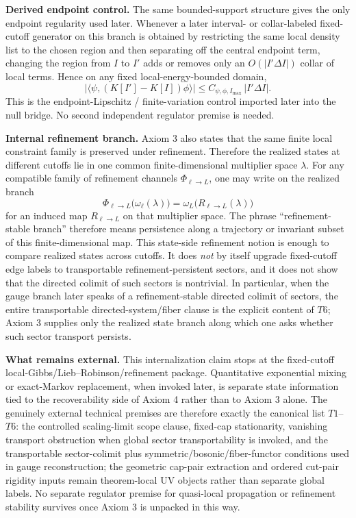 \textbf{Derived endpoint control.} The same bounded-support structure gives the only endpoint regularity used later. Whenever a later interval- or collar-labeled fixed-cutoff generator on this branch is obtained by restricting the same local density list to the chosen region and then separating off the central endpoint term, changing the region from \(I\) to \(I'\) adds or removes only an \(O(|I'\Delta I|)\) collar of local terms. Hence on any fixed local-energy-bounded domain,
\[
\left|\langle\psi,(K[I']-K[I])\phi\rangle\right|
\le
C_{\psi,\phi,I_{\max}}\,|I'\Delta I|.
\]
This is the endpoint-Lipschitz / finite-variation control imported later into the null bridge. No second independent regulator premise is needed.

\textbf{Internal refinement branch.} Axiom 3 also states that the same finite local constraint family is preserved under refinement. Therefore the realized states at different cutoffs lie in one common finite-dimensional multiplier space \(\lambda\). For any compatible family of refinement channels \(\Phi_{\ell\to L}\), one may write on the realized branch
\[
\Phi_{\ell\to L}\bigl(\omega_\ell(\lambda)\bigr)
=
\omega_L\!\bigl(R_{\ell\to L}(\lambda)\bigr)
\]
for an induced map \(R_{\ell\to L}\) on that multiplier space. The phrase ``refinement-stable branch'' therefore means persistence along a trajectory or invariant subset of this finite-dimensional map. This state-side refinement notion is enough to compare realized states across cutoffs. It does \emph{not} by itself upgrade fixed-cutoff edge labels to transportable refinement-persistent sectors, and it does not show that the directed colimit of such sectors is nontrivial. In particular, when the gauge branch later speaks of a refinement-stable directed colimit of sectors, the entire transportable directed-system/fiber clause is the explicit content of \(T6\); Axiom 3 supplies only the realized state branch along which one asks whether such sector transport persists.

\textbf{What remains external.} This internalization claim stops at the fixed-cutoff local-Gibbs/Lieb--Robinson/refinement package. Quantitative exponential mixing or exact-Markov replacement, when invoked later, is separate state information tied to the recoverability side of Axiom 4 rather than to Axiom 3 alone. The genuinely external technical premises are therefore exactly the canonical list \(T1\)--\(T6\): the controlled scaling-limit scope clause, fixed-cap stationarity, vanishing transport obstruction when global sector transportability is invoked, and the transportable sector-colimit plus symmetric/bosonic/fiber-functor conditions used in gauge reconstruction; the geometric cap-pair extraction and ordered cut-pair rigidity inputs remain theorem-local UV objects rather than separate global labels. No separate regulator premise for quasi-local propagation or refinement stability survives once Axiom 3 is unpacked in this way.

